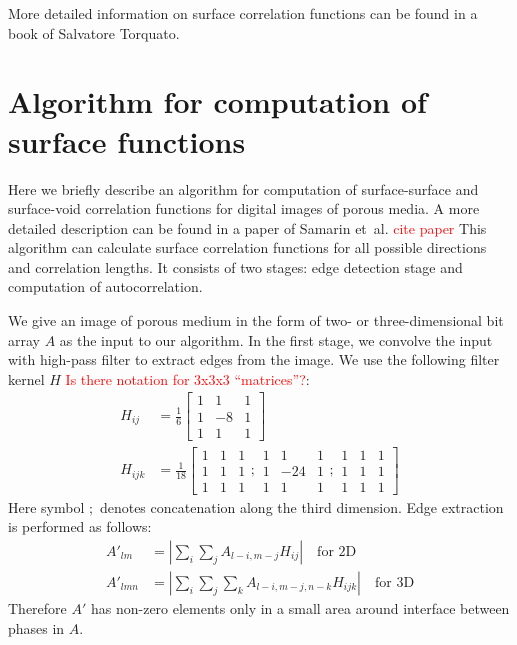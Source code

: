 \documentclass[reprint,amsmath,amssymb,aps,pre,showkeys,showpacs]{revtex4-1}
\begin{document}
More detailed information on surface correlation functions can be found in a
book of Salvatore Torquato\cite{Torquato_book}.

\section{Algorithm for computation of surface functions}
\label{sec:algo}
Here we briefly describe an algorithm for computation of surface-surface and
surface-void correlation functions for digital images of porous media. A more
detailed description can be found in a paper of Samarin
et~al. \textcolor{red}{cite paper} This algorithm can calculate surface
correlation functions for all possible directions and correlation lengths. It
consists of two stages: edge detection stage and computation of
autocorrelation.

We give an image of porous medium in the form of two- or three-dimensional bit
array $A$ as the input to our algorithm. In the first stage, we convolve the
input with high-pass filter to extract edges from the image. We use the
following filter kernel $H$ \textcolor{red}{Is there notation for 3x3x3
  ``matrices''?}:
\begin{align}
  H_{ij} &= \frac{1}{6} \left[
    \begin{array}{ccc}
      1 & 1 & 1 \\
      1 & -8 & 1 \\
      1 & 1 & 1
    \end{array}
    \right] \label{eq:filter-3x3-2d} \\
  H_{ijk} &= \frac{1}{18} \left[
    \begin{array}{ccc}
      1 & 1 & 1 \\
      1 & 1 & 1 \\
      1 & 1 & 1
    \end{array} ;
    \begin{array}{ccc}
      1 & 1 & 1 \\
      1 & -24 & 1 \\
      1 & 1 & 1
    \end{array} ;
    \begin{array}{ccc}
      1 & 1 & 1 \\
      1 & 1 & 1 \\
      1 & 1 & 1
    \end{array}
    \right] \label{eq:filter-3x3-3d}
\end{align}
Here symbol $;$ denotes concatenation along the third dimension. Edge extraction
is performed as follows:
\begin{align*}
  A'_{lm}  &= \left| \sum_i\sum_j A_{l-i, m-j}H_{ij} \right| \quad \text{for 2D} \\
  A'_{lmn} &= \left| \sum_i\sum_j\sum_k A_{l-i, m-j, n-k}H_{ijk} \right| \quad
  \text{for 3D}
\end{align*}
Therefore $A'$ has non-zero elements only in a small area around interface
between phases in $A$.
\end{document}
